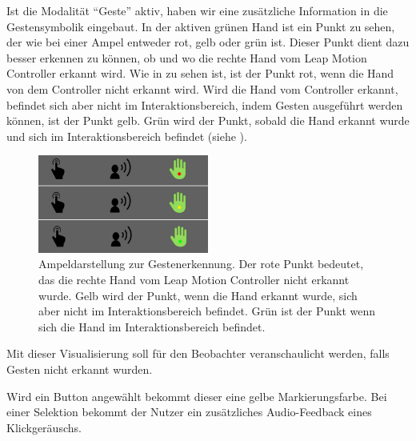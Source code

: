 Ist die Modalität "`Geste"' aktiv, haben wir eine zusätzliche Information in die Gestensymbolik eingebaut. 
In der aktiven grünen Hand ist ein Punkt zu sehen, der wie bei einer Ampel entweder rot, gelb oder grün ist. 
Dieser Punkt dient dazu besser erkennen zu können, ob und wo die rechte Hand vom Leap Motion Controller erkannt wird. 
Wie in  zu sehen ist, ist der Punkt rot, wenn die Hand von dem Controller nicht erkannt wird. 
Wird die Hand vom Controller erkannt, befindet sich aber nicht im Interaktionsbereich, indem Gesten ausgeführt werden können, ist der Punkt gelb.
Grün wird der Punkt, sobald die Hand erkannt wurde und sich im Interaktionsbereich befindet (siehe ).
\begin{figure}[ht]
  \centering
  \includegraphics[width=0.5\textwidth]{img/Gestenerkennung.jpg}
  \caption[Ampeldarstellung zur Gestenerkennung]{Ampeldarstellung zur Gestenerkennung. Der rote Punkt bedeutet, das die rechte Hand vom Leap Motion Controller nicht erkannt wurde. 
	Gelb wird der Punkt, wenn die Hand erkannt wurde, sich aber nicht im Interaktionsbereich befindet. 
	Grün ist der Punkt wenn sich die Hand im Interaktionsbereich befindet.}
	\label{fig:Ampeldarstellung}
\end{figure} 
Mit dieser Visualisierung soll für den Beobachter veranschaulicht werden, falls Gesten nicht erkannt wurden. 

Wird ein Button angewählt bekommt dieser eine gelbe Markierungsfarbe. 
Bei einer Selektion bekommt der Nutzer ein zusätzliches Audio-Feedback eines Klickgeräuschs.

